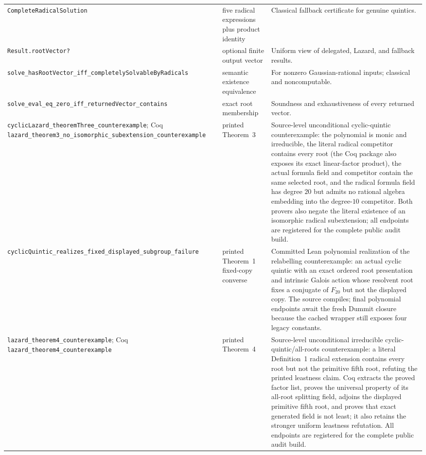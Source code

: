 \documentclass[11pt,a4paper,oneside]{article}
\newcommand{\lean}[1]{\nolinkurl{#1}}
\begin{document}
\begin{longtable}{>{\raggedright\arraybackslash}p{}
                  >{\raggedright\arraybackslash}p{}
                  >{\raggedright\arraybackslash}p{}}
\lean{CompleteRadicalSolution} & five radical expressions plus product identity & Classical fallback certificate for genuine quintics.\\
\lean{Result.rootVector?} & optional finite output vector & Uniform view of delegated, Lazard, and fallback results.\\
\lean{solve_hasRootVector_iff_completelySolvableByRadicals} & semantic existence equivalence & For nonzero Gaussian-rational inputs; classical and noncomputable.\\
\lean{solve_eval_eq_zero_iff_returnedVector_contains} & exact root membership & Soundness and exhaustiveness of every returned vector.\\
\lean{cyclicLazard_theoremThree_counterexample}; Coq \lean{lazard_theorem3_no_isomorphic_subextension_counterexample} & printed Theorem~3 & Source-level unconditional cyclic-quintic counterexample: the polynomial is monic and irreducible, the literal radical competitor contains every root (the Coq package also exposes its exact linear-factor product), the actual formula field and competitor contain the same selected root, and the radical formula field has degree $20$ but admits no rational algebra embedding into the degree-$10$ competitor.  Both provers also negate the literal existence of an isomorphic radical subextension; all endpoints are registered for the complete public audit build.\\
\lean{cyclicQuintic_realizes_fixed_displayed_subgroup_failure} & printed Theorem~1 fixed-copy converse & Committed Lean polynomial realization of the relabelling counterexample: an actual cyclic quintic with an exact ordered root presentation and intrinsic Galois action whose resolvent root fixes a conjugate of $F_{20}$ but not the displayed copy.  The source compiles; final polynomial endpoints await the fresh Dummit closure because the cached wrapper still exposes four legacy constants.\\
\lean{lazard_theorem4_counterexample}; Coq \lean{lazard_theorem4_counterexample} & printed Theorem~4 & Source-level unconditional irreducible cyclic-quintic/all-roots counterexample: a literal Definition~1 radical extension contains every root but not the primitive fifth root, refuting the printed leastness claim.  Coq extracts the proved factor list, proves the universal property of its all-root splitting field, adjoins the displayed primitive fifth root, and proves that exact generated field is not least; it also retains the stronger uniform leastness refutation.  All endpoints are registered for the complete public audit build.\\

\end{longtable}
\end{document}
